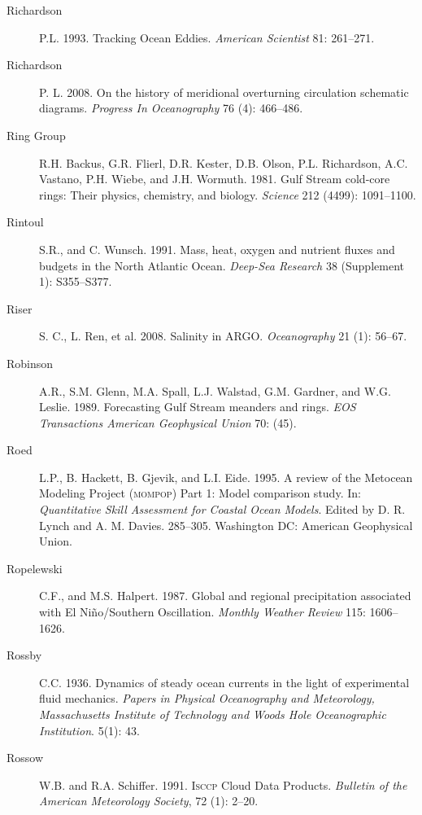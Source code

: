 \begin{description}
\item [Richardson]P.L. 1993. Tracking Ocean Eddies. \textit{American
  Scientist} 81: 261--271.

\item [Richardson]P. L. 2008. On the history of meridional overturning
  circulation schematic diagrams. \textit{Progress In Oceanography} 76
  (4): 466--486.

\item [Ring Group]R.H. Backus, G.R. Flierl, D.R. Kester, D.B. Olson,
  P.L. Richardson, A.C. Vastano, P.H. Wiebe, and
  J.H. Wormuth. 1981. Gulf Stream cold-core rings: Their physics,
  chemistry, and biology. \textit{Science} 212 (4499): 1091--1100.

\item [Rintoul]S.R., and C. Wunsch. 1991. Mass, heat, oxygen and
  nutrient fluxes and budgets in the North Atlantic
  Ocean. \textit{Deep-Sea Research} 38 (Supplement 1): S355--S377.

\item [Riser]S. C., L. Ren, et al. 2008. Salinity in
  ARGO. \textit{Oceanography} 21 (1): 56--67.

\item [Robinson]A.R., S.M. Glenn, M.A. Spall, L.J. Walstad,
  G.M. Gardner, and W.G. Leslie. 1989. Forecasting Gulf Stream
  meanders and rings. \textit{EOS Transactions American Geophysical
    Union} 70: (45).

\item [Roed]L.P., B. Hackett, B. Gjevik, and L.I. Eide. 1995. A review
  of the Metocean Modeling Project (\textsc{mompop}) Part 1: Model
  comparison study. In: \textit{Quantitative Skill Assessment for
    Coastal Ocean Models}. Edited by D. R. Lynch and
  A. M. Davies. 285--305. Washington DC: American Geophysical Union.

\item [Ropelewski]C.F., and M.S. Halpert. 1987. Global and regional
  precipitation associated with El Ni\~{n}o/Southern
  Oscillation. \textit{Monthly Weather Review} 115: 1606--1626.

\item [Rossby]C.C. 1936. Dynamics of steady ocean currents in the
  light of experimental fluid mechanics. \textit{Papers in Physical
    Oceanography and Meteorology, Massachusetts Institute of
    Technology and Woods Hole Oceanographic Institution}. 5(1): 43.

\item [Rossow]W.B. and R.A. Schiffer. 1991. \textsc{Isccp} Cloud Data
  Products. \textit{Bulletin of the American Meteorology Society}, 72
  (1): 2--20.


\end{description}
